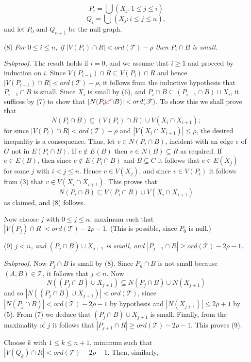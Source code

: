 \begin{equation*}
P_i = \bigcup (X_j : 1 \le j \le i)
\end{equation*}
\begin{equation*}
Q_i = \bigcup (X_j : i \le j \le n),
\end{equation*}
and let $P_0$ and $Q_{n+1}$ be the null graph.

\hspace*{12pt}(8) \textit{For $0 \le i \le n$, if $|V(P_i) \cap R| < ord(\mathscr{T}) - \rho$ then $P_i \cap B$ is small.}

\textit{Subproof.} The result holds if $i = 0$, and we assume that $i \ge 1$ and proceed by induction on $i$. Since $V(P_{i-1}) \cap R \subseteq V(P_i) \cap R$ and hence $|V(P_{i-1}) \cap R| < ord(\mathscr{T}) - \rho$, it follows from the inductive hypothesis that $P_{i-1} \cap B$ is small. Since $X_i$ is small by (6), and $P_i \cap B \subseteq (P_{i-1} \cap B) \cup X_i$, it suffices by (7) to show that $|N(P_i \delm{\cup}\fix{\cap} B)| < ord(\mathscr{T})$. To show this we shall prove that
\begin{equation*}
N(P_i \cap B) \subseteq (V(P_i) \cap R) \cup V(X_i \cap X_{i+1});
\end{equation*}
for since $|V(P_i) \cap R| < ord(\mathscr{T}) - \rho$ and $|V(X_i \cap X_{i+1})| \le \rho$, the desired inequality is a consequence. Thus, let $v \in N(P_i \cap B)$, incident with an edge $e$ of $G$ not in $E(P_i \cap B)$. If $e \notin E(B)$ then $v \in N(B) \subseteq R$ as required. If $e \in E(B)$, then since $e \notin E(P_i \cap B)$ and $B \subseteq C$ it follows that $e \in E(X_j)$ for some $j$ with $i < j \le n$. Hence $v \in V(X_j)$, and since $v \in V(P_i)$ it follows from (3) that $v \in V(X_i \cap X_{i+1})$. This proves that
\begin{equation*}
N(P_i \cap B) \subseteq V(P_i \cap R) \cup V(X_i \cap X_{i+1})
\end{equation*}
as claimed, and (8) follows.

Now choose $j$ with $0 \le j \le n$, maximum such that $|V(P_j) \cap R| < ord(\mathscr{T}) - 2\rho - 1$. (This is possible, since $P_0$ is null.)

\hspace*{12pt}(9) \textit{$j < n$, and $(P_j \cap B) \cup X_{j+1}$ is small, and $|P_{j+1} \cap R| \ge ord(\mathscr{T}) - 2\rho - 1$.}

\textit{Subproof.} Now $P_j \cap B$ is small by (8). Since $P_n \cap B$ is not small because $(A, B) \in \mathscr{T}$, it follows that $j < n$. Now
\begin{equation*}
N((P_j \cap B) \cup X_{j+1}) \subseteq N(P_j \cap B) \cup N(X_{j+1})
\end{equation*}
and so $|N((P_j \cap B) \cup X_{j+1})| < ord(\mathscr{T})$, since $|N(P_j \cap B)| < ord(\mathscr{T}) - 2\rho - 1$ by hypothesis and $|N(X_{j+1})| \le 2\rho+1$ by (5). From (7) we deduce that $(P_j \cap B) \cup X_{j+1}$ is small. Finally, from the maximality of $j$ it follows that $|P_{j+1} \cap R| \ge ord(\mathscr{T}) - 2\rho - 1$. This proves (9).

Choose $k$ with $1 \le k \le n+1$, minimum such that $|V(Q_k) \cap R| < ord(\mathscr{T}) - 2\rho - 1$. Then, similarly,
